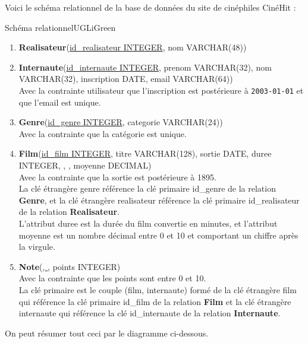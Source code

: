 \documentclass[a4paper,12pt]{article}
\begin{document}
\newpage
{}


Voici le schéma relationnel de la base de données du site de cinéphiles CinéHit :\\

\begin{encadrecolore}{Schéma relationnel}{UGLiGreen}

\begin{enumerate}[\textbullet]
	\item 	\textbf{Realisateur}(\uline{id\_realisateur INTEGER}, nom VARCHAR(48))\\
	\item 	\scriptsize\textbf{Internaute}(\uline{id\_internaute INTEGER}, prenom VARCHAR(32), nom VARCHAR(32), inscription DATE, email VARCHAR(64))\\\normalsize
            Avec la contrainte utilisateur que l'inscription est postérieure à \texttt{2003-01-01} et que l'email est unique.\\
    \item   \textbf{Genre}(\uline{id\_genre INTEGER}, categorie VARCHAR(24))\\
            Avec la contrainte que la catégorie est unique.\\

     \item  \scriptsize\textbf{Film}(\uline{id\_film INTEGER}, titre VARCHAR(128), sortie DATE, duree INTEGER, , , moyenne DECIMAL)\\\normalsize
     Avec la contrainte que la sortie est postérieure à 1895.\\
     La clé étrangère genre référence la clé primaire id\_genre de la relation \textbf{Genre}, et la clé étrangère realisateur référence la clé primaire id\_realisateur de la relation \textbf{Realisateur}.\\
     L'attribut duree est la durée du film convertie en minutes, et l'attribut moyenne est un nombre décimal entre 0 et 10 et comportant un chiffre après la virgule.\\
     \item \textbf{Note}(\uline{, }, points INTEGER)\\
     Avec la contrainte que les points sont entre 0 et 10.\\
     La clé primaire est le couple (film, internaute) formé de la clé étrangère film qui référence la clé primaire id\_film de la relation \textbf{Film} et la clé étrangère internaute qui référence la clé id\_internaute  de la relation \textbf{Internaute}.

\end{enumerate}






\end{encadrecolore}
On peut résumer tout ceci par le diagramme ci-dessous.
\end{document}
